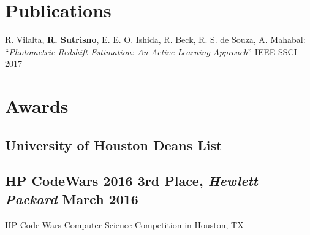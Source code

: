 \documentclass{article}
\begin{document}
\section{Publications}
\noindent \textbullet R. Vilalta, \textbf{R. Sutrisno}, E. E. O. Ishida, R. Beck, R. S. de Souza, A. Mahabal:
``\textit{Photometric Redshift Estimation: An Active Learning Approach}'' IEEE SSCI 2017


\section{Awards}
\subsection{University of Houston Deans List}
\subsection{HP CodeWars 2016 3rd Place, \textit{Hewlett Packard} March 2016}
HP Code Wars Computer Science Competition in Houston, TX
\end{document}
